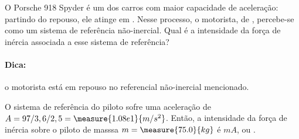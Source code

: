 \begin{question}
    O Porsche 918 Spyder é um dos carros com maior capacidade de aceleração: partindo do repouso, ele atinge  em .
    Nesse processo, o motorista, de , percebe-se como um sistema de referência não-inercial.
    Qual é a intensidade da força de inércia associada a esse sistema de referência?

    \paragraph{Dica:} o motorista está em repouso no referencial não-inercial mencionado.

    \begin{answer}
    \end{answer}

    \begin{solution}
      O sistema de referência do piloto sofre uma aceleração de $A = 97/3,6/2,5 = \measure{1.08e1}{m/s^2}$.
      Então, a intensidade da força de inércia sobre o piloto de masssa $m = \measure{75.0}{kg}$ é $mA$, ou .
    \end{solution}
\end{question}